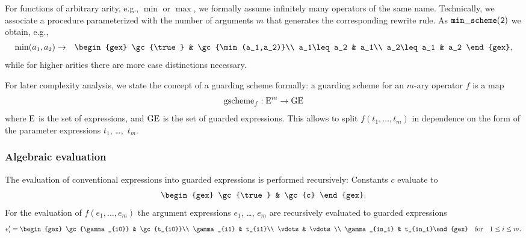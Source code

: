 For functions of arbitrary arity, e.g., $\min$ or $\max$, we formally
assume infinitely many operators of the same name. Technically, we
associate a procedure parameterized with the number of arguments $m$
that generates the corresponding rewrite rule. As ${\tt
min\_scheme(2)}$ we obtain, e.g.,
\begin{eqnarray}
\min(a_1,a_2) & \to &
\begin{gex}
\gc{\true} & \gc{\min(a_1,a_2)}\\
a_1\leq a_2 & a_1\\
a_2\leq a_1 & a_2
\end{gex}\label{binminscheme},
\end{eqnarray}
while for higher arities there are more case distinctions necessary.

For later complexity analysis, we state the concept of a guarding
scheme formally: a guarding scheme for an $m$-ary operator $f$ is a
map
\[
\textrm{gscheme}_f: \textrm{E}^m \to \textrm{GE}
\]
where $\textrm{E}$ is the set of expressions, and $\textrm{GE}$ is the set of guarded
expressions. This allows to split $f(t_1,\ldots,t_m)$ in dependence
on the form of the parameter expressions $t_1$, \dots,~$t_m$.
%
\subsubsection{Algebraic evaluation}\label{algeval}
The evaluation of conventional expressions into guarded expressions is
performed recursively: Constants $c$ evaluate to
\[
\begin{gex}
\gc{\true} & \gc{c}
\end{gex}.
\]
For the evaluation
of $f(e_1,\ldots,e_m)$ the argument expressions $e_1$, \ldots, $e_m$
are recursively evaluated to guarded expressions
\begin{equation}
e_i'=\begin{gex}
\gc{\gamma_{i0}} & \gc{t_{i0}}\\
\gamma_{i1} & t_{i1}\\
\vdots & \vdots\\
\gamma_{in_i} & t_{in_i}\end{gex}\quad\mbox{for}\quad 1\leq i\leq m.
\label{eprimes}
\end{equation}


